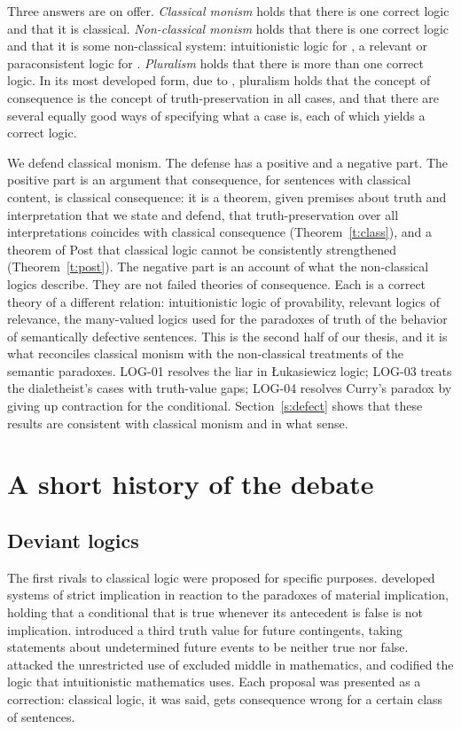 \documentclass{situationist-preprint}
\begin{document}
Three answers are on offer. \emph{Classical monism} holds that there is one correct logic and that it is classical. \emph{Non-classical monism} holds that there is one correct logic and that it is some non-classical system: intuitionistic logic for \citet{Dummett1991}, a relevant or paraconsistent logic for \citet{Priest2006b}. \emph{Pluralism} holds that there is more than one correct logic. In its most developed form, due to \citet{BeallRestall2000,BeallRestall2006}, pluralism holds that the concept of consequence is the concept of truth-preservation in all cases, and that there are several equally good ways of specifying what a case is, each of which yields a correct logic.

We defend classical monism. The defense has a positive and a negative part. The positive part is an argument that consequence, for sentences with classical content, is classical consequence: it is a theorem, given premises about truth and interpretation that we state and defend, that truth-preservation over all interpretations coincides with classical consequence (Theorem~\ref{t:class}), and a theorem of Post that classical logic cannot be consistently strengthened (Theorem~\ref{t:post}). The negative part is an account of what the non-classical logics describe. They are not failed theories of consequence. Each is a correct theory of a different relation: intuitionistic logic of provability, relevant logics of relevance, the many-valued logics used for the paradoxes of truth of the behavior of semantically defective sentences. This is the second half of our thesis, and it is what reconciles classical monism with the non-classical treatments of the semantic paradoxes. LOG-01 resolves the liar in Łukasiewicz logic; LOG-03 treats the dialetheist's cases with truth-value gaps; LOG-04 resolves Curry's paradox by giving up contraction for the conditional. Section~\ref{s:defect} shows that these results are consistent with classical monism and in what sense.

\section{A short history of the debate}\label{s:history}

\subsection{Deviant logics}

The first rivals to classical logic were proposed for specific purposes. \citet{LewisLangford1932} developed systems of strict implication in reaction to the paradoxes of material implication, holding that a conditional that is true whenever its antecedent is false is not implication. \citet{Lukasiewicz1920} introduced a third truth value for future contingents, taking statements about undetermined future events to be neither true nor false. \citet{Brouwer1908} attacked the unrestricted use of excluded middle in mathematics, and \citet{Heyting1930} codified the logic that intuitionistic mathematics uses. Each proposal was presented as a correction: classical logic, it was said, gets consequence wrong for a certain class of sentences.
\end{document}
